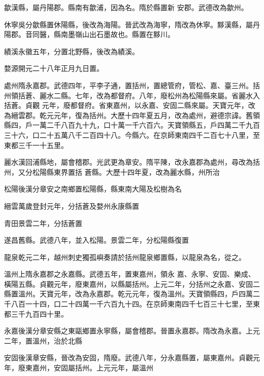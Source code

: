 \begin{pinyinscope}
 歙漢縣，屬丹陽郡。縣南有歙浦，因為名。隋於縣置新
 安郡。武德改為歙州。



 休寧吳分歙縣置休陽縣，後改為海陽。晉武改為海寧，隋改為休寧。黟漢縣，屬丹陽郡。音同醫，縣南墨嶺山出石墨故也。縣置在黟川。



 績溪永徽五年，分置北野縣，後改為績溪。



 婺源開元二十八年正月九日置。



 處州隋永嘉郡。武德四年，平李子通，置括州，置總管府，管松、嘉、臺三州。括州領括蒼、麗水二縣。七年，改為都督府。八年，廢松州為松陽縣來屬。省麗水入括蒼。貞觀
 元年，廢都督府。省東嘉州，以永嘉、安固二縣來屬。天寶元年，改為縉雲郡。乾元元年，復為括州。大歷十四年夏五月，改為處州，避德宗諱。舊領縣四，戶一萬二千八百九十九，口十萬一千六百六。天寶領縣五，戶四萬二千九百三十六，口二十五萬八千二百四十八。今縣六。在京師東南四千二百七十八里，至東都三千一十五里。



 麗水漢回浦縣地，屬會稽郡。光武更為章安。隋平陳，改永嘉郡為處州，尋改為括州，又分松陽縣東界置括
 蒼縣。大歷十四年夏，改為麗水縣，州所治



 松陽後漢分章安之南鄉置松陽縣，縣東南大陽及松樹為名



 縉雲萬歲登封元年，分括蒼及婺州永康縣置



 青田景雲二年，分括蒼置



 遂昌舊縣。武德八年，並入松陽。景雲二年，分松陽縣復置



 龍泉乾元二年，越州刺史獨孤嶼奏請於括州龍泉鄉置縣，以龍泉為名，從之。



 溫州上隋永嘉郡之永嘉縣。武德五年，置東嘉州，領永
 嘉、永寧、安固、樂成、橫陽五縣。貞觀元年，廢東嘉州，以縣屬括州。上元二年，分括州之永嘉、安固二縣置溫州。天寶元年，改為永嘉郡。乾元元年，復為溫州。天寶領縣四，戶四萬二千八百一十四，口二十四萬一千六百九十四。在京師東南四千七百三十七里，至東都三千九百四十里。



 永嘉後漢分章安縣之東甌鄉置永寧縣，屬會稽郡。晉置永嘉郡。隋改為永嘉。上元二年，置溫州，治於北縣



 安固後漢章安縣，晉改為安固，隋廢。武德八年，分永嘉縣置，屬東嘉州。貞觀元年，廢東嘉州，安固屬括州。上元元年，屬溫州




\end{pinyinscope}
